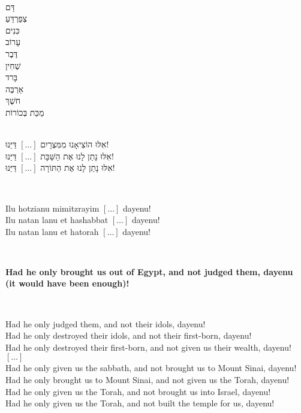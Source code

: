 \documentclass[a4paper,12pt,openany]{memoir}
\newcommand{\HgInst}[1]{{\noindent\sffamily{\bfseries{#1}}}}
\newcommand{\HgEllipsis}{\ensuremath{\left[\ldots\right]}}
\newcommand{\HgHL}[1]{{\Large\textbf{#1}\par\noindent\\[-.5em]}}
\newenvironment{HgEnglish}{\strut\\\noindent}{\vspace{1em}}
\newenvironment{HgTranslit}{\strut\\\noindent\begin{itshape}}{\end{itshape}\vspace{1em}}
\newenvironment{HgHebrew}{\begin{hebrew}\strut\\\noindent\Large}{\end{hebrew}}
\begin{document}
\begin{minipage}{.32\textwidth}
  \begin{HgHebrew}
    \begin{Spacing}{1}
      \vspace{-2em}
  דָּם 
  \\
  צְפֵרְדֵּעַ 
  \\
  כִּנִים 
  \\
  עָרוֹב 
  \\
  דֶּבֶר 
  \\
  שְׁחִין 
  \\
  בָּרד
  \\
  אַרְבֶּה 
  \\
  חשֶׁךְ 
  \\
  מַכַּת בְּכוֹרוֹת 
  \end{Spacing}
  \end{HgHebrew}
\end{minipage}

\HgInst{Then read or sing:}

\begin{HgHebrew}
  אִלּוּ הוֹצִיאָנוּ מִמִּצְרָיִם
  \HgEllipsis{}
  דַּיֵּנוּ!
  \\
  אִלּוּ נָתַן לָנוּ אֶת הַשַּׁבָּת
  \HgEllipsis{}
  דַּיֵּנוּ!
  \\
  אִלּוּ נָתַן לָנוּ אֶת הַתּוֹרָה
  \HgEllipsis{}
  דַּיֵּנוּ!
\end{HgHebrew}

\begin{HgTranslit}
  Ilu hotzianu mimitzrayim \HgEllipsis{} dayenu! \\
  Ilu natan lanu et hashabbat \HgEllipsis{} dayenu! \\
  Ilu natan lanu et hatorah \HgEllipsis{} dayenu!
\end{HgTranslit}

\begin{HgEnglish}
  \HgHL{
  Had he only brought us out of Egypt, and not judged them, dayenu \\ (it would
  have been enough)!}
  Had he only judged them, and not their idols, dayenu!\\
  Had he only destroyed their idols, and not their first-born, dayenu!\\
  Had he only destroyed their first-born, and not given us their wealth, dayenu!\\
  \HgEllipsis\\
  Had he only given us the sabbath, and not brought us to Mount Sinai, dayenu!\\
  Had he only brought us to Mount Sinai, and not given us the Torah, dayenu!\\
  Had he only given us the Torah, and not brought us into Israel, dayenu!\\
  Had he only given us the Torah, and not built the temple for us, dayenu!
\end{HgEnglish}
\end{document}
